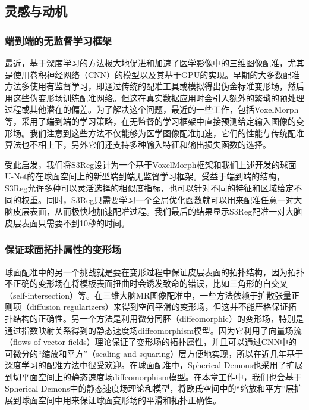 \subsection{灵感与动机}
\subsubsection{端到端的无监督学习框架}
最近，基于深度学习的方法极大地促进和加速了医学影像中的三维图像配准，尤其是使用卷积神经网络（CNN）的模型以及其基于GPU的实现\cite{dalca2018unsupervised,balakrishnan2018unsupervised,niethammer2019metric}。早期的大多数配准方法\cite{krebs2017robust,rohe2017svf}多使用有监督学习，即通过传统的配准工具或模拟得出伪金标准变形场，然后用这些伪变形场训练配准网络。但这在真实数据应用时会引入额外的繁琐的预处理过程或其他潜在的偏差。为了解决这个问题，最近的一些工作\cite{dalca2018unsupervised,balakrishnan2018unsupervised,niethammer2019metric,de2019deep,zhou2020unsupervised}，包括VoxelMorph\cite{balakrishnan2018unsupervised}等，采用了端到端的学习策略，在无监督的学习框架中直接预测给定输入图像的变形场。我们注意到这些方法不仅能够为医学图像配准加速，它们的性能与传统配准算法也不相上下，另外它们还支持多种输入特征和输出损失函数的选择。

受此启发，我们将S3Reg设计为一个基于VoxelMorph框架\cite{balakrishnan2018unsupervised}和我们上述开发的球面U-Net的在球面空间上的新型端到端无监督学习框架。受益于端到端的结构，S3Reg允许多种可以灵活选择的相似度指标，也可以针对不同的特征和区域给定不同的权重。同时，S3Reg只需要学习一个全局优化函数就可以用来配准任意一对大脑皮层表面，从而极快地加速配准过程。我们最后的结果显示S3Reg配准一对大脑皮层表面只需要不到10秒的时间。

\subsubsection{保证球面拓扑属性的变形场}\label{sec:保证球面拓扑属性的变形场}
球面配准中的另一个挑战就是要在变形过程中保证皮层表面的拓扑结构，因为拓扑不正确的变形场在将模板表面扭曲时会诱发致命的错误，比如三角形的自交叉（self-intersection）等。在三维大脑MR图像配准中，一些方法\cite{balakrishnan2018unsupervised,zhou2020unsupervised}依赖于扩散张量正则项（diffusion regularizers）来得到空间平滑的变形场，但这并不能严格保证拓扑结构的正确性。另一个方法是利用微分同胚（diffeomorphic）的变形场\cite{beg2005computing}，特别是通过指数映射关系得到的静态速度场diffeomorphism模型\cite{arsigny2006log}。因为它利用了向量场流（flows of vector fields）理论保证了变形场的拓扑属性，并且可以通过CNN中的可微分的“缩放和平方”（scaling and squaring）层方便地实现\cite{dalca2018unsupervised,krebs2019learning}，所以在近几年基于深度学习的配准方法中很受欢迎。在球面配准中，Spherical Demons\cite{yeo2009spherical}也采用了扩展到切平面空间上的静态速度场diffeomorphism模型\cite{olver2000applications}。在本章工作中，我们也会基于Spherical Demons中的静态速度场理论和模型，将欧氏空间中的“缩放和平方”层扩展到球面空间中用来保证球面变形场的平滑和拓扑正确性。

